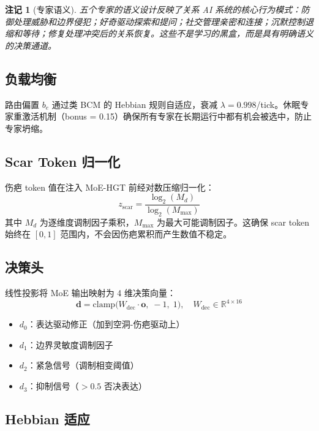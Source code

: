 \documentclass[11pt]{article}
\newtheorem{remark}[theorem]{注记}
\begin{document}
\begin{remark}[专家语义]
五个专家的语义设计反映了关系 AI 系统的核心行为模式：\emph{防御}处理威胁和边界侵犯；\emph{好奇}驱动探索和提问；\emph{社交}管理亲密和连接；\emph{沉默}控制退缩和等待；\emph{修复}处理冲突后的关系恢复。这些不是学习的黑盒，而是具有明确语义的决策通道。
\end{remark}

\subsection{负载均衡}

路由偏置 $b_e$ 通过类 BCM 的 Hebbian 规则自适应，衰减 $\lambda = 0.998$/tick。休眠专家重激活机制（bonus = 0.15）确保所有专家在长期运行中都有机会被选中，防止专家坍缩。

\subsection{Scar Token 归一化}

伤疤 token 值在注入 MoE-HGT 前经对数压缩归一化：
\begin{equation}
z_{\text{scar}} = \frac{\log_2(M_d)}{\log_2(M_{\max})}
\end{equation}
其中 $M_d$ 为逐维度调制因子乘积，$M_{\max}$ 为最大可能调制因子。这确保 scar token 始终在 $[0, 1]$ 范围内，不会因伤疤累积而产生数值不稳定。

\subsection{决策头}

线性投影将 MoE 输出映射为 4 维决策向量：
\begin{equation}
\mathbf{d} = \text{clamp}\bigl(W_{\text{dec}} \cdot \mathbf{o},\; -1,\; 1\bigr), \quad W_{\text{dec}} \in \mathbb{R}^{4 \times 16}
\end{equation}
\begin{itemize}
\item $d_0$：表达驱动修正（加到空洞-伤疤驱动上）
\item $d_1$：边界灵敏度调制因子
\item $d_2$：紧急信号（调制相变阈值）
\item $d_3$：抑制信号（$> 0.5$ 否决表达）
\end{itemize}

\subsection{Hebbian 适应}
\end{document}
